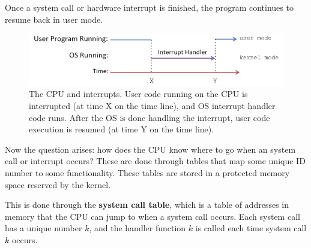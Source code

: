 \documentclass{article}
\begin{document}
\begin{definition}
\begin{enumerate}
      \end{enumerate}
      Once a system call or hardware interrupt is finished, the program continues to resume back in user mode. 
      \begin{figure}[H]
        \centering 
        \includegraphics[scale=0.4]{img/interrupt.png}
        \caption{The CPU and interrupts. User code running on the CPU is interrupted (at time X on the time line), and OS interrupt handler code runs. After the OS is done handling the interrupt, user code execution is resumed (at time Y on the time line).} 
        \label{fig:interrupt}
      \end{figure}
    \end{definition}

    Now the question arises: how does the CPU know where to go when an system call or interrupt occurs? These are done through tables that map some unique ID number to some functionality. These tables are stored in a protected memory space reserved by the kernel. 

    \begin{definition}
      This is done through the \textbf{system call table}, which is a table of addresses in memory that the CPU can jump to when a system call occurs. Each system call has a unique number $k$, and the handler function $k$ is called each time system call $k$ occurs. 
    \end{definition}
\end{document}
